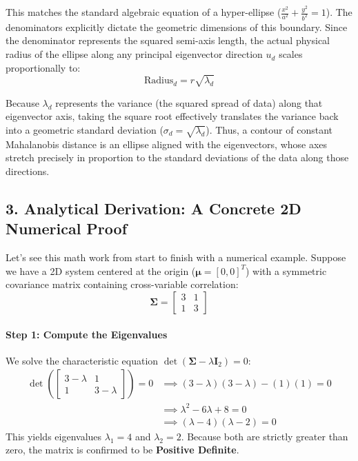 \documentclass{article}
\begin{document}
This matches the standard algebraic equation of a hyper-ellipse ($\frac{x^2}{a^2} + \frac{y^2}{b^2} = 1$). The denominators explicitly dictate the geometric dimensions of this boundary. Since the denominator represents the squared semi-axis length, the actual physical radius of the ellipse along any principal eigenvector direction $u_d$ scales proportionally to:
\[ \text{Radius}_d = r\sqrt{\lambda_d} \]

Because $\lambda_d$ represents the variance (the squared spread of data) along that eigenvector axis, taking the square root effectively translates the variance back into a geometric standard deviation ($\sigma_d = \sqrt{\lambda_d}$). Thus, a contour of constant Mahalanobis distance is an ellipse aligned with the eigenvectors, whose axes stretch precisely in proportion to the standard deviations of the data along those directions.

\subsection*{3. Analytical Derivation: A Concrete 2D Numerical Proof}
Let's see this math work from start to finish with a numerical example. Suppose we have a 2D system centered at the origin ($\boldsymbol{\mu} = [0, 0]^T$) with a symmetric covariance matrix containing cross-variable correlation:
\begin{equation*}
\boldsymbol{\Sigma} = \begin{bmatrix} 3 & 1 \\ 1 & 3 \end{bmatrix}
\end{equation*}

\paragraph{Step 1: Compute the Eigenvalues}
We solve the characteristic equation $\det(\boldsymbol{\Sigma} - \lambda \mathbf{I}_2) = 0$:
\begin{align*}
\det \left( \begin{bmatrix} 3-\lambda & 1 \\ 1 & 3-\lambda \end{bmatrix} \right) = 0 &\implies (3-\lambda)(3-\lambda) - (1)(1) = 0 \\
&\implies \lambda^2 - 6\lambda + 8 = 0 \\
&\implies (\lambda - 4)(\lambda - 2) = 0
\end{align*}
This yields eigenvalues $\lambda_1 = 4$ and $\lambda_2 = 2$. Because both are strictly greater than zero, the matrix is confirmed to be \textbf{Positive Definite}.
\end{document}
